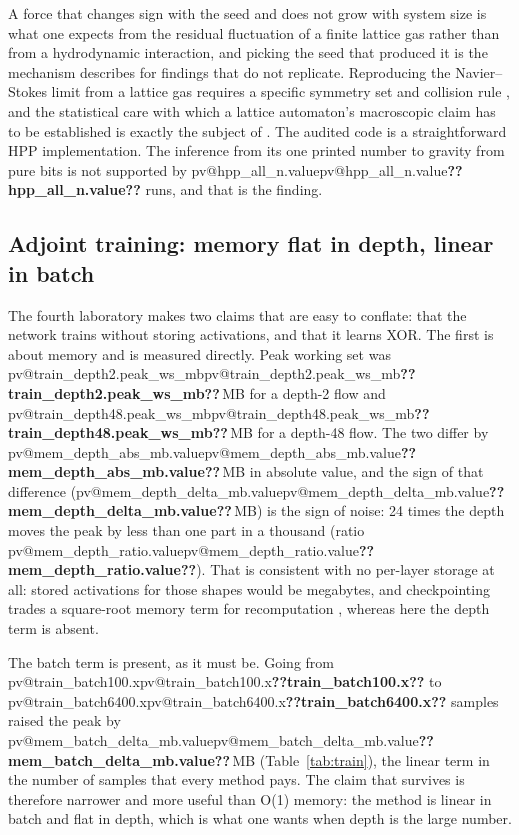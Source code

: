 \documentclass[11pt,a4paper]{article}
\makeatletter
\newcommand{\val}[1]{\ifcsname pv@#1\endcsname\csname pv@#1\endcsname\else\textbf{??#1??}\fi}
\makeatother
\begin{document}
A force that changes sign with the seed and does not grow with system size is what one expects
from the residual fluctuation of a finite lattice gas rather than from a hydrodynamic
interaction, and picking the seed that produced it is the mechanism \citet{ioannidis2005}
describes for findings that do not replicate. Reproducing the Navier--Stokes limit from a lattice gas requires a specific symmetry
set and collision rule \citep{frisch1986}, and the statistical care with which a lattice
automaton's macroscopic claim has to be established is exactly the subject of \citet{wolfram1986}.
The audited code is a straightforward HPP implementation. The inference from its one printed
number to gravity from pure bits is not supported by \val{hpp_all_n.value} runs, and that is the
finding.

\subsection{Adjoint training: memory flat in depth, linear in batch}
\label{sec:train}

The fourth laboratory makes two claims that are easy to conflate: that the network trains without
storing activations, and that it learns XOR. The first is about memory and is measured directly.
Peak working set was \val{train_depth2.peak_ws_mb}\,MB for a depth-2 flow and
\val{train_depth48.peak_ws_mb}\,MB for a depth-48 flow. The two differ by
\val{mem_depth_abs_mb.value}\,MB in absolute value, and the sign of that difference
(\val{mem_depth_delta_mb.value}\,MB) is the sign of noise: 24 times the depth moves the peak by
less than one part in a thousand (ratio \val{mem_depth_ratio.value}). That is consistent with no per-layer storage at all: stored activations for those shapes
would be megabytes, and checkpointing trades a square-root memory term for recomputation
\citep{griewank2008}, whereas here the depth term is absent.

The batch term is present, as it must be. Going from \val{train_batch100.x} to \val{train_batch6400.x} samples raised the peak by
\val{mem_batch_delta_mb.value}\,MB (Table~\ref{tab:train}), the linear term in the number of
samples that every method pays. The claim that survives is therefore narrower and more useful
than O(1) memory: the method is linear in batch and flat in depth, which is what one wants when
depth is the large number.
\end{document}
